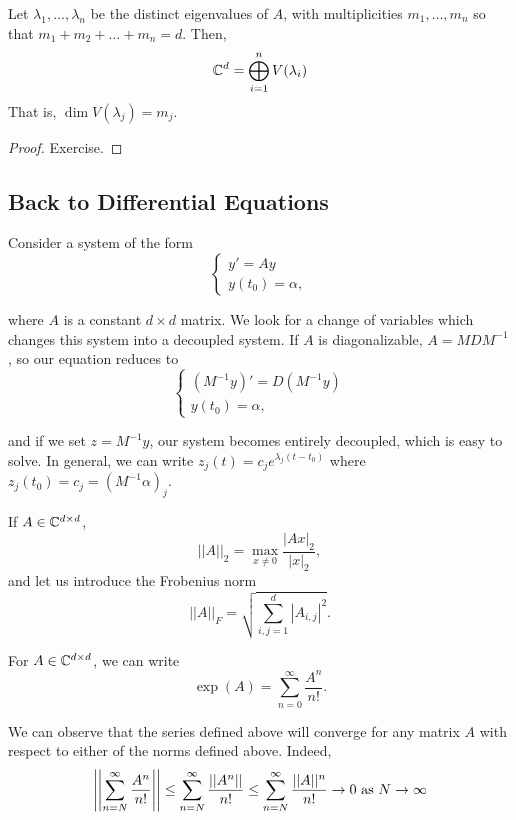 \documentclass{article}
\begin{document}
\begin{theorem}[Claim.]{}
    Let $\lambda_1, \hdots, \lambda_n$ be the distinct eigenvalues of $A$, with multiplicities $m_1, \hdots, m_n$ so that $m_1 + m_2 + \hdots + m_n = d$. Then, 
    \[
        \mathbb{C}^d = \bigoplus_{i = 1}^n V(\lambda_i)
    \]
    That is, $\dim V(\lambda_j) = m_j$. 
\end{theorem}
\begin{proof}
    Exercise.
\end{proof}

\subsection*{Back to Differential Equations}
Consider a system of the form 
\[
    \begin{cases}
        y' = Ay \\
        y(t_0) = \alpha,
    \end{cases}
\]

where $A$ is a constant $d \times d$ matrix. We look for a change of variables which changes this system into a decoupled system. If $A$ is diagonalizable, $A = M D M^{-1}$, so our equation reduces to
\[
    \begin{cases}
        (M^{-1}y)' = D(M^{-1}y) \\
        y(t_0) = \alpha,
    \end{cases}
\] 
 
and if we set $z = M^{-1} y$, our system becomes entirely decoupled, which is easy to solve. In general, we can write $z_j(t) = c_j e^{\lambda_j(t - t_0)}$ where $z_j(t_0) = c_j = (M^{-1}\alpha)_j$. 

\begin{definition}{}
    If $A \in \mathbb{C}^{d \times d}$, 
        \[
            ||A||_2 = \max_{x \neq 0} \frac{|Ax|_2}{|x|_2},
        \]
    and let us introduce the Frobenius norm 
        \[
            ||A||_F = \sqrt{\sum_{i, j = 1}^d |A_{i, j}|^2}. 
        \]
\end{definition}

\begin{definition}{}
    For $A \in \mathbb{C}^{d \times d}$, we can write 
    \[
        \exp(A) = \sum_{n = 0}^{\infty} \frac{A^n}{n!}.
    \]
\end{definition}
We can observe that the series defined above will converge for any matrix $A$ with respect to either of the norms defined above. Indeed, 
    \[
        \left|\left|\sum_{n = N}^\infty \frac{A^n}{n!}\right|\right| \leq \sum_{n = N}^\infty \frac{||A^n||}{n!} \leq \sum_{n = N}^\infty \frac{||A||^n}{n!} \to 0 \text{ as } N \to \infty
    \]
\end{document}
